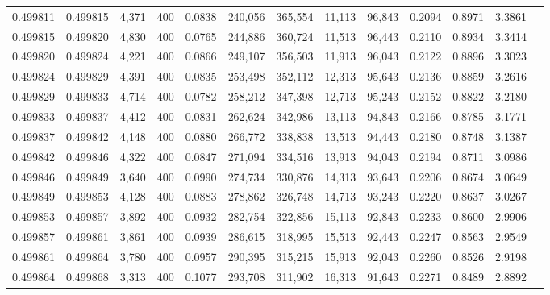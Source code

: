 \begin{tabular}{rrrrrrrrrrrrr}
0.499811 & 0.499815 &  4,371 & 400 &                                     0.0838 & 240,056 & 365,554 &  11,113 &  96,843 & 0.2094 & 0.8971 & 3.3861 \\
0.499815 & 0.499820 &  4,830 & 400 &                                     0.0765 & 244,886 & 360,724 &  11,513 &  96,443 & 0.2110 & 0.8934 & 3.3414 \\
0.499820 & 0.499824 &  4,221 & 400 &                                     0.0866 & 249,107 & 356,503 &  11,913 &  96,043 & 0.2122 & 0.8896 & 3.3023 \\
0.499824 & 0.499829 &  4,391 & 400 &                                     0.0835 & 253,498 & 352,112 &  12,313 &  95,643 & 0.2136 & 0.8859 & 3.2616 \\
0.499829 & 0.499833 &  4,714 & 400 &                                     0.0782 & 258,212 & 347,398 &  12,713 &  95,243 & 0.2152 & 0.8822 & 3.2180 \\
0.499833 & 0.499837 &  4,412 & 400 &                                     0.0831 & 262,624 & 342,986 &  13,113 &  94,843 & 0.2166 & 0.8785 & 3.1771 \\
0.499837 & 0.499842 &  4,148 & 400 &                                     0.0880 & 266,772 & 338,838 &  13,513 &  94,443 & 0.2180 & 0.8748 & 3.1387 \\
0.499842 & 0.499846 &  4,322 & 400 &                                     0.0847 & 271,094 & 334,516 &  13,913 &  94,043 & 0.2194 & 0.8711 & 3.0986 \\
0.499846 & 0.499849 &  3,640 & 400 &                                     0.0990 & 274,734 & 330,876 &  14,313 &  93,643 & 0.2206 & 0.8674 & 3.0649 \\
0.499849 & 0.499853 &  4,128 & 400 &                                     0.0883 & 278,862 & 326,748 &  14,713 &  93,243 & 0.2220 & 0.8637 & 3.0267 \\
0.499853 & 0.499857 &  3,892 & 400 &                                     0.0932 & 282,754 & 322,856 &  15,113 &  92,843 & 0.2233 & 0.8600 & 2.9906 \\
0.499857 & 0.499861 &  3,861 & 400 &                                     0.0939 & 286,615 & 318,995 &  15,513 &  92,443 & 0.2247 & 0.8563 & 2.9549 \\
0.499861 & 0.499864 &  3,780 & 400 &                                     0.0957 & 290,395 & 315,215 &  15,913 &  92,043 & 0.2260 & 0.8526 & 2.9198 \\
0.499864 & 0.499868 &  3,313 & 400 &                                     0.1077 & 293,708 & 311,902 &  16,313 &  91,643 & 0.2271 & 0.8489 & 2.8892 \\

\end{tabular}
